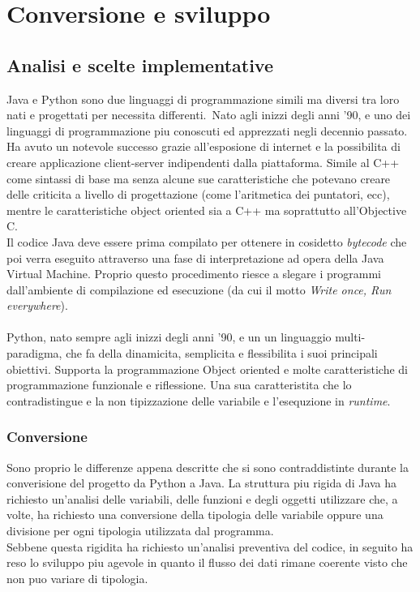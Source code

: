 \chapter{Conversione e sviluppo}

\section{Analisi e scelte implementative}
Java e Python sono due linguaggi di programmazione simili ma diversi tra loro nati e progettati per necessita differenti.\
Nato agli inizzi degli anni '90, e uno dei linguaggi di programmazione piu conoscuti ed apprezzati
negli decennio passato. Ha avuto un notevole successo grazie all'esposione di internet e la possibilita
di creare applicazione client-server indipendenti dalla piattaforma. Simile al C++ come sintassi di base
ma senza alcune sue caratteristiche che potevano creare delle criticita a livello di progettazione
(come l'aritmetica dei puntatori, ecc)\cite{new_2}, mentre le caratteristiche object oriented sia
a C++ ma soprattutto all'Objective C.\\
Il codice Java deve essere prima compilato per ottenere in cosidetto \textit{bytecode} che poi verra
eseguito attraverso una fase di interpretazione ad opera della Java Virtual Machine. Proprio questo procedimento
riesce a slegare i programmi dall'ambiente di compilazione ed esecuzione (da cui il motto \textit{Write once, Run everywhere}). \\
\\
Python, nato sempre agli inizzi degli anni '90, e un un linguaggio multi-paradigma, che fa della dinamicita,
semplicita e flessibilita i suoi principali obiettivi. Supporta la programmazione Object oriented e molte
caratteristiche di programmazione funzionale e riflessione. Una sua caratteristita che lo contradistingue e la
non tipizzazione delle variabile e l'esequzione in \textit{runtime}.\\

\subsection{Conversione}
Sono proprio le differenze appena descritte che si sono contraddistinte durante la converisione del progetto da Python a Java.
La struttura piu rigida di Java ha richiesto un'analisi delle variabili, delle funzioni e degli oggetti utilizzare che,
a volte, ha richiesto una conversione della tipologia delle variabile oppure una divisione per ogni tipologia utilizzata dal programma.\\
Sebbene questa rigidita ha richiesto un'analisi preventiva del codice, in seguito ha reso lo sviluppo piu agevole in quanto
il flusso dei dati rimane coerente visto che non puo variare di tipologia.

